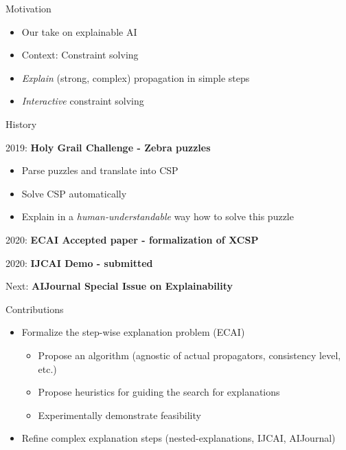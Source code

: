 \documentclass{beamer}
\begin{document}
\begin{frame}{\small{Motivation}}



    \begin{itemize}
        \item Our take on explainable AI
        \item Context: Constraint solving
        \item \emph{Explain} (strong, complex) propagation in simple steps
        \item \emph{Interactive} constraint solving
    \end{itemize}

\end{frame}



\begin{frame}{\small{History}}


    2019: \textbf{Holy Grail Challenge - Zebra puzzles}

    \begin{itemize}
        \item Parse puzzles and translate into CSP
        \item Solve CSP automatically
        \item Explain in a \emph{human-understandable} way how to solve this puzzle
    \end{itemize}
    \vspace{1em}
    2020: \textbf{ECAI Accepted paper - formalization of XCSP} \\

    \vspace{1em}

    2020: \textbf{IJCAI Demo - submitted} \\
    \vspace{1em}

    Next: \textbf{AIJournal Special Issue on Explainability} \\
\end{frame}

\begin{frame}{\small{Contributions}}

    \begin{itemize}
        \item Formalize the step-wise explanation problem (ECAI)
              \begin{itemize}
                  \item Propose an algorithm (agnostic of actual propagators, consistency level, etc.)
                  \item Propose heuristics for guiding the search for explanations
                  \item Experimentally demonstrate feasibility
              \end{itemize}
        \item Refine complex explanation steps (nested-explanations, IJCAI, AIJournal)

    \end{itemize}

\end{frame}
\end{document}
